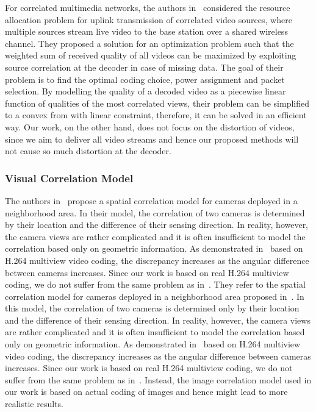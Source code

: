 For correlated multimedia networks, the authors in~\cite{AdaptiveCrossLayerRA} considered the resource allocation problem for uplink transmission of correlated video sources, where multiple sources stream live video to the base station over a shared wireless channel.
They proposed a solution for an optimization problem such that the weighted sum of
received quality of all videos can be maximized by exploiting source correlation at the decoder in case of missing data.
The goal of their problem is to find the optimal coding choice, power assignment and packet selection.
By modelling the quality of a decoded video as a piecewise linear function of qualities of the most correlated views, their problem can be simplified to a convex from with linear constraint, therefore, it can be solved in an efficient way.
Our work, on the other hand, does not focus on the distortion of videos, since we aim to deliver all video streams and hence our proposed methods will not cause so much distortion at the decoder.
%
\subsubsection{Visual Correlation Model}
The authors in~\cite{SpatialCorrelationModel} propose a spatial correlation model for cameras deployed in a neighborhood area.
In their model, the correlation of two cameras is determined by their location and the difference of their sensing direction.
In reality, however, the camera views are rather complicated and it is often insufficient to model the correlation based only on geometric information.
As demonstrated in~\cite{RealisticModel} based on H.264 multiview video coding, the discrepancy increases as the angular difference between cameras increases.
Since our work is based on real H.264 multiview coding, we do not suffer from the same problem as in~\cite{SpatialCorrelationModel}.
%
They refer to the spatial correlation model for cameras deployed in a neighborhood area proposed in~\cite{SpatialCorrelationModel}.
In this model, the correlation of two cameras is determined only by their location and the difference of their sensing direction.
In reality, however, the camera views are rather complicated and it is often insufficient to model the correlation based only on geometric information.
As demonstrated in~\cite{RealisticModel} based on H.264 multiview video coding, the discrepancy increases as the angular difference between cameras increases.
Since our work is based on real H.264 multiview coding, we do not suffer from the same problem as in~\cite{DMCPclustering,imageModelCluster}.
Instead, the image correlation model used in our work is based on actual coding of images and hence might lead to more realistic results.
%
